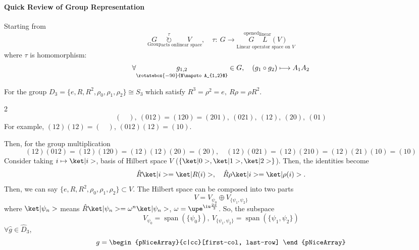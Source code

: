 \paragraph{Quick Review of Group Representation}

Starting from
\[
  \underset{\text{Group}}G
  \overset{\tau}{\underset{\text{acts on}}{\circlearrowright}}
  \underset{\text{linear space}}V, \quad
  \tau:\ G \rightarrow
  \underset{\text{Linear operator space on $V$}}
    {\overset{\text{opened}}G\overset{\text{linear}}L(V)}
\]
where $\tau$ is homomorphism:
\[
  \forall \underset{\rotatebox{-90}{$\mapsto A_{1,2}$}}{g_{1,2}} \in G, \quad
  (g_1 \circ g_2) \longmapsto A_1 A_2
\]

\begin{example}
  For the group $D_3 = \{e, R, R^2, \rho_0, \rho_1, \rho_2\} \cong S_3$
  which satisfy $R^3 = \rho^2 = e,\ R\rho = \rho R^2$.
  \begin{paracol}{2}
    \[
      (\quad),\ (012) = (120) = (201),\ (021),\ (12),\ (20),\ (01)
    \]
    For example, $(12)(12) = (\quad)$, $(012)(12) = (10)$.
    \switchcolumn \centering
  \end{paracol}
  Then, for the group multiplication
  \[
    (12)(012) = (12)(120) = (12)(12)(20) = (20), \quad
    (12)(021) = (12)(210) = (12)(21)(10) = (10)
  \]
  Consider taking $i \mapsto \ket|i>$, basis of Hilbert space $V$
  ($\{\ket|0>, \ket|1>, \ket|2>\}$). Then, the identities become
  \[
    \hat R\ket|i> = \ket|R(i)>,   \quad
    \hat R\rho\ket|i> = \ket|\rho(i)>.
  \]
  Then, we can say $\{e, R, R^2, \rho_0, \rho_1, \rho_2\} \subset V$.
  The Hilbert space can be composed into two parts
  \[
    V = V_{\psi_0} \oplus V_{\{\psi_1,\psi_2\}}
  \]
  where $\ket|\psi_n>$ means $\hat R\ket|\psi_n> = \omega^n \ket|\psi_n>$,
  $\omega = \upe^{\iu\frac{2\pi}{3}}$.
  So, the subspace
  \[
    V_{\psi_0} = \operatorname{span}(\{\psi_0\}),\
    V_{\{\psi_1,\psi_2\}} = \operatorname{span}(\{\psi_1,\psi_2\})
  \]
  $\forall \hat g \in \hat D_3$,
  \[
    g =
    \begin{pNiceArray}{c|cc}[first-col, last-row]

\end{pNiceArray}\]
\end{example}
